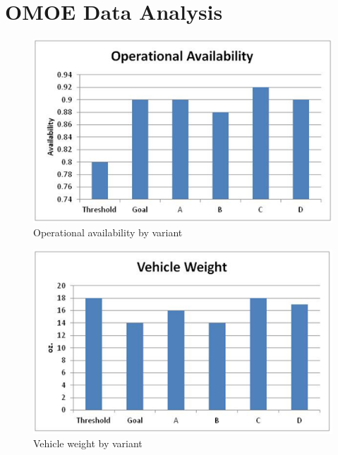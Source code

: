 \documentclass[letterpaper,10pt]{article}
\begin{document}
\section{OMOE Data Analysis}
\label{sec:omoe}
\begin{figure}[h!tbp]
	\begin{center}
		\includegraphics[scale=0.8]{images/operationalAvailability.png}
	\end{center}
	\caption{Operational availability by variant}
	\label{fig:operationalAvailability}
\end{figure}

\begin{figure}[h!tbp]
	\begin{center}
		\includegraphics[scale=0.8]{images/vehicleWeight.png}
	\end{center}
	\caption{Vehicle weight by variant}
	\label{fig:vehicleWeight}
\end{figure}
\end{document}
